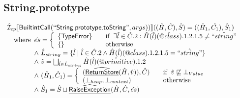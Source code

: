 \subsection{String.prototype}
\[
\begin{array}{l}
\aI _{cp}\lbr \SF{BuiltintCall}(``\SF{String.prototype.toString}",args))\rbr((\hat{H},\hat{C}), \hat{S})
  = ((\hat{H}_1, \hat{C_1}), \hat{S}_1)\\
\quad\wherec{
  \hat{es} = \left\{\begin{array}{l@{\quad\quad}l}
      \{ \SF{TypeError} \}
      & \ifc{\exists \hat{l} \in \hat{C}.2 : \hat{H}(\hat{l})(\avarprop{class}).1.2.1.5  \neq \hat{``string"}}\\
      \{ \}& \owc\\
    \end{array}\right.\\
  \land\ \hat{L}_{string} = \{ \hat{l} \mid \hat{l} \in \hat{C}.2 \land \hat{H}(\hat{l})(\avarprop{class}).1.2.1.5  = \hat{``string"}\}\\
  \land\ \hat{v} = \bigsqcup_{\hat{l} \in \hat{L}_{string}} \hat{H}(\hat{l})(\avarprop{primitive}).1.2\\
  \land\ (\hat{H}_1, \hat{C}_1) = 
    \left\{\begin{array}{l@{\quad\quad}l}
      (\ahf{ReturnStore}(\hat{H}, \hat{v})), \hat{C})
      & \ifc{\hat{v} \not\sqsubseteq \bot_{Value}}\\
      (\bot_{heap}, \bot_{context}) & \owc \\
    \end{array}\right.\\
  \land\ \hat{S}_1 = \hat{S} \sqcup \ahf{RaiseException}(\hat{H}, \hat{C}, \hat{es})\\
  }\\
\\\\



\end{array}\]
